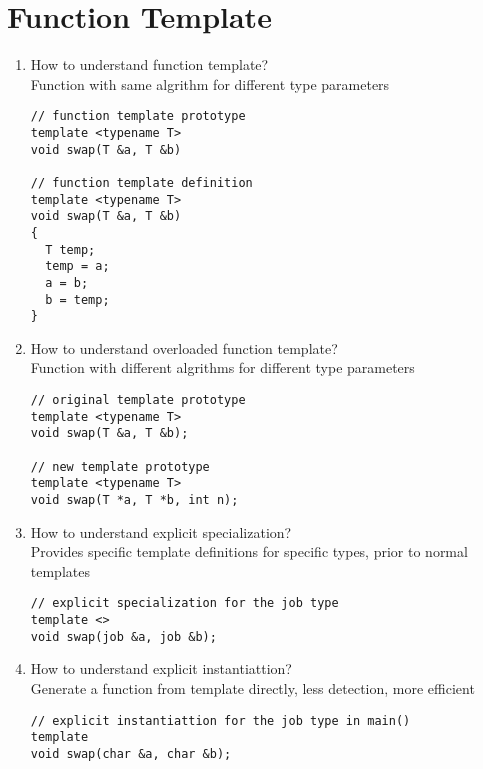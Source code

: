 \documentclass[10pt,a4paper,oneside]{article}
\begin{document}
\section{Function Template}
\begin{enumerate}[1.]
\item How to understand function template?\\
Function with same algrithm for different type parameters
\begin{lstlisting}
// function template prototype
template <typename T>
void swap(T &a, T &b)

// function template definition
template <typename T>
void swap(T &a, T &b)
{
  T temp;
  temp = a;
  a = b;
  b = temp;
}
\end{lstlisting}
\item How to understand overloaded function template?\\
Function with different algrithms for different type parameters
\begin{lstlisting}
// original template prototype
template <typename T>
void swap(T &a, T &b);

// new template prototype
template <typename T>
void swap(T *a, T *b, int n);

\end{lstlisting}
\item How to understand explicit specialization?\\
Provides specific template definitions for specific types, prior to normal templates
\begin{lstlisting}
// explicit specialization for the job type
template <>
void swap(job &a, job &b);

\end{lstlisting}
\item How to understand explicit instantiattion?\\
Generate a function from template directly, less detection, more efficient
\begin{lstlisting}
// explicit instantiattion for the job type in main()
template 
void swap(char &a, char &b);

\end{lstlisting}
\end{enumerate}
\end{document}
